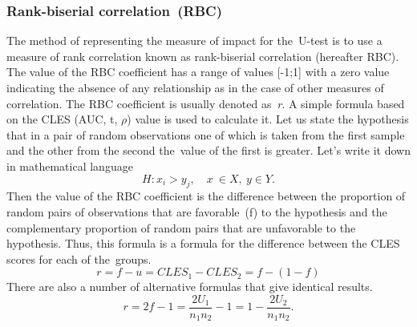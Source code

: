 \documentclass[]{scrreprt}
\begin{document}
\subsubsection{Rank-biserial correlation~(RBC)}
The method of representing the measure of impact for the~U-test is to use a measure of rank correlation known as rank-biserial correlation (hereafter RBC). The value of the RBC coefficient has a range of values [-1;1] with a zero value indicating the absence of any relationship as in the case of other measures of correlation. The RBC coefficient is usually denoted as~\textit{r}. A simple formula based on the CLES (AUC, t, $\rho$) value is used to calculate it. Let us state the hypothesis that in a pair of random observations one of which is taken from the first sample and the other from the second the~value of the first is greater. Let's write it down in mathematical language
\begin{equation}\label{eq:RBC-hypothesis}
H: x_{i} > y_{j}, \quad x \ \in X,\ y \in Y.
\end{equation}
Then the value of the RBC coefficient is the difference between the proportion of random pairs of observations that are favorable~(f) to the hypothesis and the complementary proportion of random pairs that are unfavorable to the hypothesis. Thus, this formula is a formula for the difference between the CLES scores for each of the~groups.
\begin{equation}\label{eq:RBC-formula-1}
r = f - u = CLES_{1} - CLES_{2} = f - (1 - f)
\end{equation}
There are also a number of alternative formulas that give identical results.
\begin{equation}\label{eq:RBC-formula-2}
r = 2f -1 = \frac{2U_{1}}{n_{1}n_{2}}-1 = 1 - \frac{2U_{2}}{n_{1}n_{2}}.
\end{equation}
%
\end{document}
